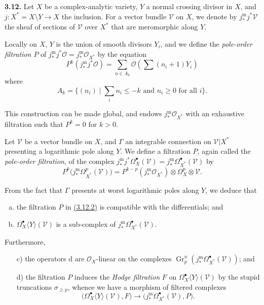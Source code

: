 \documentclass{report}
\newenvironment{rmenv}[1]
  {\phantomsection\par\medskip\noindent\textbf{#1.}\rmfamily}
  {\par\medskip}
\renewcommand{\cal}[1]{{\mathcal{#1}}}
\newcommand{\dd}{\mathrm{d}}
\renewcommand{\geq}{\geqslant}
\renewcommand{\leq}{\leqslant}
\DeclareMathOperator{\Gr}{Gr}
\newcommand{\oldpage}[1]{\marginpar{\footnotesize$\Big\vert$ \textit{p.~#1}}}
\begin{document}
\begin{rmenv}{3.12}
\label{II.3.12}
  Let $X$ be a complex-analytic variety, $Y$ a normal crossing divisor in $X$, and $j\colon X^*=X\setminus Y\to X$ the inclusion.
  For a vector bundle $\cal{V}$ on $X$, we denote by $j_*^\mathrm{m}j^*\cal{V}$ the sheaf of sections of $\cal{V}$ over $X^*$ that are meromorphic along $Y$.

\oldpage{80}
  Locally on $X$, $Y$ is the union of smooth divisors $Y_i$, and we define the \emph{pole-order filtration $P$} of $j_*^\mathrm{m}j^*\cal{O}=j_*^\mathrm{m}\cal{O}_{X^*}$ by the equation
  \[
  \label{II.3.12.1}
    P^k(j_*^\mathrm{m}j^*\cal{O})
    = \sum_{\underline{n}\in A_k}\cal{O}(\sum(n_i+1)Y_i)
  \tag{3.12.1}
  \]
  where
  \[
    A_k = \big\{
      (n_i) \mid \mbox{$\sum_i n_i\leq-k$ and $n_i\geq0$ for all $i$}
    \big\}.
  \]

  This construction can be made global, and endows $j_*^\mathrm{m}\cal{O}_{X^*}$ with an exhaustive filtration such that $P^k=0$ for $k>0$.

  Let $\cal{V}$ be a vector bundle on $X$, and $\Gamma$ an integrable connection on $\cal{V}|X^*$ presenting a logarithmic pole along $Y$.
  We define a filtration $P$, again called the \emph{pole-order filtration}, of the complex $j_*^\mathrm{m}j^*\Omega_X^\bullet(\cal{V})=j_*^\mathrm{m}\Omega_{X^*}^\bullet(\cal{V})$ by
  \[
  \label{II.3.12.2}
    P^k\big(j_*^\mathrm{m}\Omega_{X^*}^p(\cal{V})\big)
    = P^{k-p}(j_*^\mathrm{m}\cal{O}_{X^*})\otimes\Omega_X^p\otimes\cal{V}.
  \tag{3.12.2}
  \]

  From the fact that $\Gamma$ presents at worst logarithmic poles along $Y$, we deduce that
  \begin{enumerate}[a)]
    \item the filtration $P$ in \hyperref[II.3.12.2]{(3.12.2)} is compatible with the differentials; and
    \item $\Omega_X^\bullet\langle Y\rangle(\cal{V})$ is a sub-complex of $j_*^\mathrm{m}\Omega_{X^*}^\bullet(\cal{V})$.
  \end{enumerate}

  Furthermore,
  \begin{enumerate}
    \item[{\rm c)}] the operators $\dd$ are $\cal{O}_X$-linear on the complexes $\Gr_p^n(j_*^\mathrm{m}\Omega_{X^*}^\bullet(\cal{V}))$; and
    \item[{\rm d)}] the filtration $P$ induces the \emph{Hodge filtration} $F$ on $\Omega_X^\bullet\langle Y\rangle(\cal{V})$ by the stupid truncations $\sigma_{\geq p}$, whence we have a morphism of filtered complexes
    \[
    \label{II.3.12.3}
      \big(\Omega_X^\bullet\langle Y\rangle(\cal{V}), F\big)
      \to
      \big(j_*^\mathrm{m}\Omega_{X^*}^\bullet(\cal{V}), P\big).
    \tag{3.12.3}
    \]
  \end{enumerate}
\end{rmenv}
\end{document}
